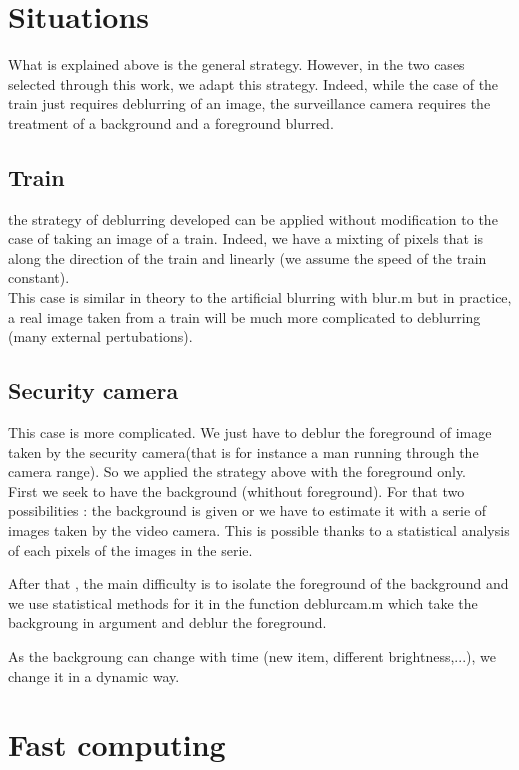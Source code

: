 \section{Situations}

What is explained above is the general strategy. However, in the two cases selected through this work, we adapt this strategy. 
Indeed, while the case of the train just requires deblurring of an image, the surveillance camera requires the treatment of a background and a foreground blurred.

\subsection{Train}
 
the strategy of deblurring developed can be applied without modification to the case of taking an image of a train. Indeed, we have a mixting of pixels that is along the direction of the train and linearly (we assume the speed of the train constant). 
\\
This case is similar in theory to the artificial blurring with blur.m but in practice, a real image taken from a train will be much more complicated to deblurring (many external pertubations). 

\subsection{Security camera}

This case is more complicated. We just have to deblur the foreground of image taken by the security camera(that is for instance a man running through the camera range). So we applied the strategy above with the foreground only.
\\
First we seek to have the background (whithout foreground). For that two possibilities : the background is given or we have to estimate it with a serie of images taken by the video camera. This is possible thanks to a statistical analysis of each pixels of the images in the serie.

After that , the main difficulty is to isolate the foreground of the background and we use statistical methods for it in the function deblurcam.m which take the backgroung in argument and deblur the foreground.

As the backgroung can change with time (new item, different brightness,...), we change it in a dynamic way.

\section{Fast computing}

